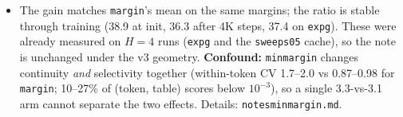 \documentclass[10pt]{article}
\newcommand{\code}[1]{{\renewcommand{\_}{\textunderscore\allowbreak}\texttt{#1}}}
\newcommand{\note}[1]{\textsuperscript{\textbf{#1}}}
\begin{document}
\begin{itemize}
  \textbf{3.2:} the argmin-switch jump is a median 0.44\% of the head output and 0.11\% of the FFN output, about $8\times$ smaller.
\item[\note{e}] The gain matches \code{margin}'s mean on the same margins; the ratio is stable through training (38.9 at init, 36.3 after 4K steps,
  37.4 on \code{exp\_g\_0193}). These were already measured on $H=4$ runs (\code{exp\_g\_0193} and the \code{sweep\_s05} cache), so the note is unchanged under the v3 geometry.
  \textbf{Confound:} \code{min\_margin} changes continuity \emph{and} selectivity together (within-token CV 1.7--2.0 vs 0.87--0.98 for
  \code{margin}; 10--27\% of (token, table) scores below $10^{-3}$), so a single 3.3-vs-3.1 arm cannot separate the two effects. Details: \code{notes\_min\_margin.md}.
\end{itemize}

\newpage
\end{document}
